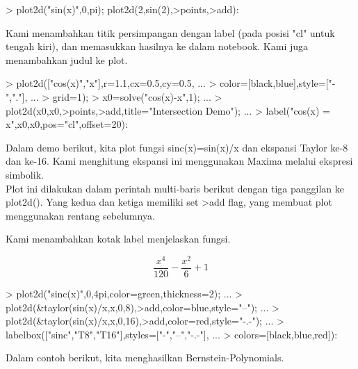 \documentclass[a4paper,10pt]{article}
\begin{document}
\begin{eulernotebook}
\begin{eulercomment}
\begin{eulercomment}
\begin{eulercomment}
\begin{eulercomment}
\begin{eulercomment}
\begin{eulercomment}
\begin{eulercomment}
\end{eulercomment}
\begin{eulerprompt}
> plot2d("sin(x)",0,pi); plot2d(2,sin(2),>points,>add):
\end{eulerprompt}
\begin{eulercomment}
Kami menambahkan titik persimpangan dengan label (pada posisi "cl"
untuk tengah kiri), dan memasukkan hasilnya ke dalam notebook. Kami
juga menambahkan judul ke plot.
\end{eulercomment}
\begin{eulerprompt}
> plot2d(["cos(x)","x"],r=1.1,cx=0.5,cy=0.5, ...
>   color=[black,blue],style=["-","."], ...
>   grid=1);
> x0=solve("cos(x)-x",1);  ...
>  plot2d(x0,x0,>points,>add,title="Intersection Demo");  ...
>  label("cos(x) = x",x0,x0,pos="cl",offset=20):
\end{eulerprompt}
\begin{eulercomment}
Dalam demo berikut, kita plot fungsi sinc(x)=sin(x)/x dan ekspansi
Taylor ke-8 dan ke-16. Kami menghitung ekspansi ini menggunakan Maxima
melalui ekspresi simbolik.\\
Plot ini dilakukan dalam perintah multi-baris berikut dengan tiga
panggilan ke plot2d(). Yang kedua dan ketiga memiliki set \textgreater{}add flag,
yang membuat plot menggunakan rentang sebelumnya.

Kami menambahkan kotak label menjelaskan fungsi.
\end{eulercomment}
\begin{eulerformula}
\[
\frac{x^4}{120}-\frac{x^2}{6}+1
\]
\end{eulerformula}
\begin{eulerprompt}
> plot2d("sinc(x)",0,4pi,color=green,thickness=2); ...
>  plot2d(&taylor(sin(x)/x,x,0,8),>add,color=blue,style="--"); ...
>  plot2d(&taylor(sin(x)/x,x,0,16),>add,color=red,style="-.-"); ...
>  labelbox(["sinc","T8","T16"],styles=["-","--","-.-"], ...
>    colors=[black,blue,red]):
\end{eulerprompt}
\begin{eulercomment}
Dalam contoh berikut, kita menghasilkan Bernstein-Polynomials.


\end{eulercomment}
\end{eulercomment}
\end{eulercomment}
\end{eulercomment}
\end{eulercomment}
\end{eulercomment}
\end{eulercomment}
\end{eulernotebook}
\end{document}
